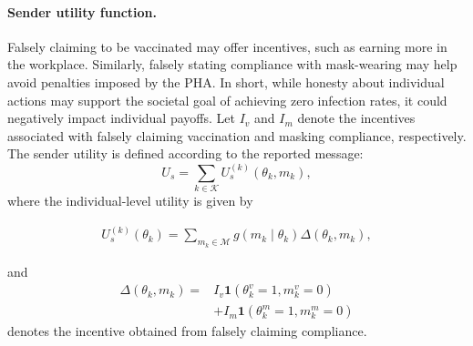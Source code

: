\documentclass[sigconf,review]{acmart}
\begin{document}
\paragraph{Sender utility function.} Falsely claiming to be vaccinated may offer incentives, such as earning more in the workplace. Similarly, falsely stating compliance with mask-wearing may help avoid penalties imposed by the PHA. In short, while honesty about individual actions may support the societal goal of achieving zero infection rates, it could negatively impact individual payoffs. Let $I_v$ and $I_m$ denote the incentives associated with falsely claiming vaccination and masking compliance, respectively.
The sender utility is defined according to the reported message:
\begin{equation}
U_s = \sum_{k\in\mathcal K} U_s^{(k)}(\theta_k,m_k),
\label{eq:utility}
\end{equation}
where the individual-level utility is given by



\begin{equation}
\begin{aligned}
U_s^{(k)}(\theta_k) = 
\sum_{m_k\in\mathcal M}
g(m_k\mid\theta_k)
\Delta(\theta_k,m_k),
\end{aligned}
\label{eq_sender_payoff_modified}
\end{equation}

and
\begin{equation}
\begin{aligned}
\Delta(\theta_k,m_k)
=&
I_v \mathbf{1} (\theta_k^v=1, m_k^v=0) \\
& + I_m \mathbf{1}(\theta_k^m=1, m_k^m=0)
\end{aligned}
\label{eq:lie_gain}
\end{equation}
denotes the incentive obtained from falsely claiming compliance.
\end{document}

